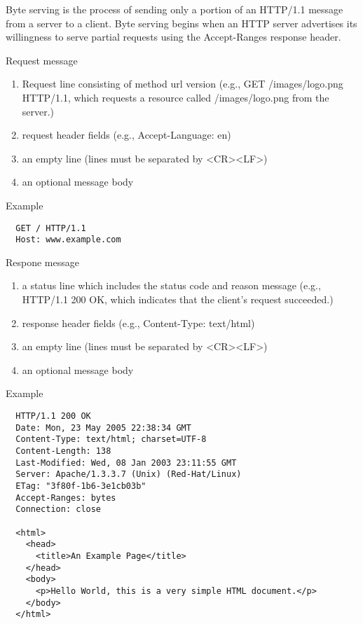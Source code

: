 Byte serving is the process of sending only a portion of an HTTP/1.1 message
from a server to a client. Byte serving begins when an HTTP server advertises
its willingness to serve partial requests using the Accept-Ranges response
header.

\noindent Request message
\begin{enumerate}
\item Request line consisting of method url version (e.g., GET
  /images/logo.png HTTP/1.1, which requests a resource called /images/logo.png
  from the server.)

\item request header fields (e.g., Accept-Language: en)

\item an empty line (lines must be separated by <CR><LF>)

\item an optional message body
\end{enumerate}
%
Example
{\small
\begin{verbatim}
  GET / HTTP/1.1
  Host: www.example.com
\end{verbatim}
}


\noindent Respone message
\begin{enumerate}
\item a status line which includes the status code and reason message (e.g.,
  HTTP/1.1 200 OK, which indicates that the client's request succeeded.)

\item response header fields (e.g., Content-Type: text/html)

\item an empty line (lines must be separated by <CR><LF>)

\item an optional message body
\end{enumerate}
%
Example
{\small
\begin{verbatim}
  HTTP/1.1 200 OK
  Date: Mon, 23 May 2005 22:38:34 GMT
  Content-Type: text/html; charset=UTF-8
  Content-Length: 138
  Last-Modified: Wed, 08 Jan 2003 23:11:55 GMT
  Server: Apache/1.3.3.7 (Unix) (Red-Hat/Linux)
  ETag: "3f80f-1b6-3e1cb03b"
  Accept-Ranges: bytes
  Connection: close

  <html>
    <head>
      <title>An Example Page</title>
    </head>
    <body>
      <p>Hello World, this is a very simple HTML document.</p>
    </body>
  </html>
  \end{verbatim}
}


